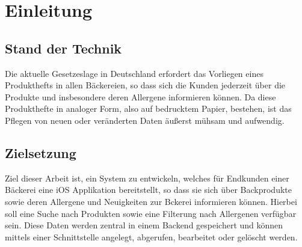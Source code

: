 \chapter{Einleitung}

\section{Stand der Technik}
Die aktuelle Gesetzeslage in Deutschland erfordert das Vorliegen eines Produkthefts in allen Bäckereien, so dass sich die Kunden jederzeit über die Produkte und insbesondere deren Allergene informieren können. Da diese Produkthefte in analoger Form, also auf bedrucktem Papier, bestehen, ist das Pflegen von neuen oder veränderten Daten äußerst mühsam und aufwendig.

\section{Zielsetzung}
Ziel dieser Arbeit ist, ein System zu entwickeln, welches für Endkunden einer Bäckerei eine iOS Applikation bereitstellt, so dass sie sich über Backprodukte sowie deren Allergene und Neuigkeiten zur Bckerei informieren können. Hierbei soll eine Suche nach Produkten sowie eine Filterung nach Allergenen verfügbar sein. Diese Daten werden zentral in einem Backend gespeichert und können mittels einer Schnittstelle angelegt, abgerufen, bearbeitet oder gelöscht werden.